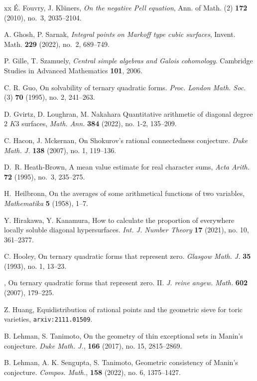 \documentclass[a4paper,12pt,reqno]{amsart}
\numberwithin{equation}{section} \numberwithin{figure}{section}
\renewcommand{\#}{\sharp}
\theoremstyle{definition}
\numberwithin{lemma}{section}
\begin{document}
\begin{thebibliography}{xx}
\'{E}. Fouvry, J. Kl\"{u}ners, 
\emph{On the negative {P}ell equation}, Ann. of Math. (2) \textbf{172} (2010), no.~3, 2035--2104.
  
 A. Ghosh, P. Sarnak, \emph{Integral points on {M}arkoff type cubic surfaces}, Invent. Math. \textbf{229} (2022), no.~2, 689--749.

P. Gille, T. Szamuely,
\textit{Central simple algebras and Galois cohomology}.
Cambridge Studies in Advanced Mathematics {\bf 101}, 2006.

{C. R. Guo}, 
{On solvability of ternary quadratic forms}.
\emph{Proc. London Math. Soc.} (3) {\bf 70} (1995), no. 2, 241--263.

D. Gvirtz, D. Loughran, M. Nakahara
Quantitative arithmetic of diagonal degree {$2$} {$K3$} surfaces, 
\emph{Math. Ann.} {\bf 384} (2022), no. 1-2, 135--209.


C. Hacon, J. Mckernan, On Shokurov's rational connectedness conjecture. 
\textit{Duke Math. J.} \textbf{138} (2007), no. 1, 119--136. 

D.~R. Heath-Brown, A mean value estimate for real character sums, 
\emph{Acta  Arith.} \textbf{72} (1995), no.~3, 235--275.

H.~Heilbronn, On the averages of some arithmetical functions of two
  variables, 
 \emph{Mathematika} \textbf{5} (1958), 1--7.

{Y. Hirakawa, Y. Kanamura}, 
{How to calculate the proportion of everywhere locally soluble
              diagonal hypersurfaces}.
\emph{Int. J. Number Theory} {\bf 17} (2021), no. 10, 361--2377.

{C. Hooley}, 
{On ternary quadratic forms that represent zero}.
\emph{Glasgow Math. J.} {\bf35} (1993), no. 1, 13--23.

, {On ternary quadratic forms that represent zero. II}. \emph{J. reine angew. Math.} {\bf602} (2007), 179--225.

Z. Huang, Equidistribution of rational points and the geometric sieve for toric varieties,
\texttt{arxiv:2111.01509}.
 
B. Lehman, S. Tanimoto, 
On the geometry of thin exceptional sets in Manin’s conjecture.
\emph{Duke Math. J.}, \textbf{166} (2017), no. 15, 2815--2869.

B. Lehman, A. K. Sengupta, S. Tanimoto, 
Geometric consistency of Manin's conjecture.
\emph{Compos. Math.}, \textbf{158} (2022), no. 6, 1375--1427. 
 

\end{thebibliography}
\end{document}
